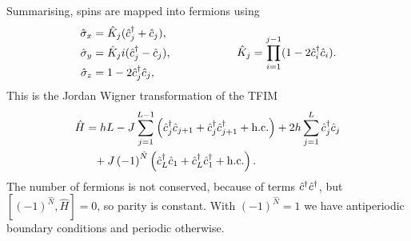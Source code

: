 Summarising, spins are mapped into fermions using
\begin{equation*}
	\left.\begin{aligned}
	    \hat{\sigma}_x &= \hat{K}_j(\hat{c}_j\D + \hat{c}_j) ,\\
	    \hat{\sigma}_y &= \hat{K}_j i(\hat{c}_j\D - \hat{c}_j) ,\\
	    \hat{\sigma}_z &= 1 - 2 \hat{c}_j\D \hat{c}_j,
	\end{aligned}\right.
	\hspace{10 mm} 
	\hspace{10 mm} 
	\hat{K}_j = \prod_{i=1}^{j-1} (1-2 \hat{c}_i\D \hat{c}_i).
\end{equation*}
This is the Jordan Wigner transformation of the TFIM
\begin{align*}
	\hat{H} &= h L - J \sum_{j=1}^{L-1} \left(\hat{c}_j^{\dag} \hat{c}_{j+1} + \hat{c}^{\dag}_j \hat{c}_{j+1}^{\dag} + \textnormal{h.c.} \right) +  2 h \sum_{j=1}^L \hat{c}_j^{\dag} \hat{c}_j \\  
	&\phantom{=} + J\left(-1\right)^{\hat{N}} \left(\hat{c}_L^{\dag} \hat{c}_1 +\hat{c}^{\dag}_L \hat{c}_{1}^{\dag}+\textnormal{h.c.} \right)
	.
\end{align*} 
The number of fermions is not conserved, because of terms $\hat{c}^{\dag} \hat{c}^{\dag}$, but $[(-1)^{\hat{N}}, \hat{H}]=0$, so parity is constant. With $(-1)^{\hat{N}}=1$ we have antiperiodic boundary conditions and periodic otherwise.
